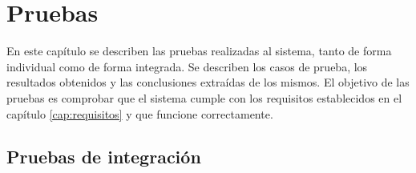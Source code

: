 \chapter{Pruebas}
\label{cap:pruebas}
En este capítulo se describen las pruebas realizadas al sistema, tanto de forma individual como de forma integrada. Se describen los casos de prueba, los resultados obtenidos y las conclusiones extraídas de los mismos.
El objetivo de las pruebas es comprobar que el sistema cumple con los requisitos establecidos en el capítulo \ref{cap:requisitos} y que funcione correctamente.

\section{Pruebas de integración}
\label{sec:pruebas-integracion}

